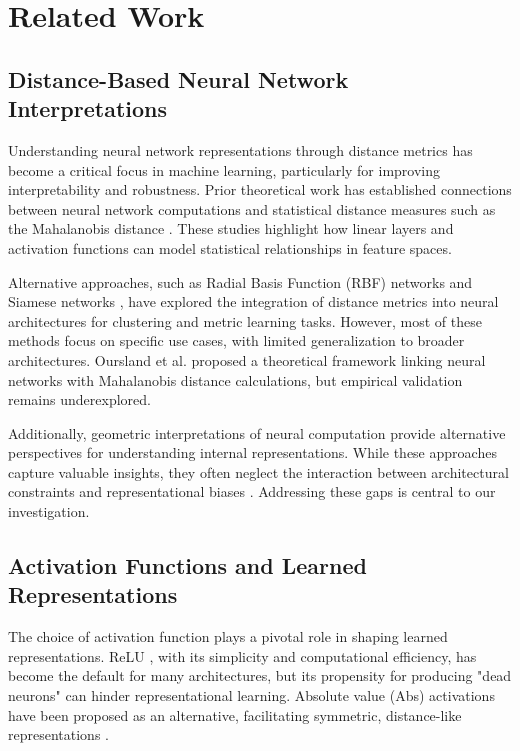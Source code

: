 \section{Related Work}

\subsection{Distance-Based Neural Network Interpretations}
Understanding neural network representations through distance metrics has become a critical focus in machine learning, particularly for improving interpretability and robustness. Prior theoretical work has established connections between neural network computations and statistical distance measures such as the Mahalanobis distance \cite{mahalanobis1936, oursland2024interpreting}. These studies highlight how linear layers and activation functions can model statistical relationships in feature spaces.

Alternative approaches, such as Radial Basis Function (RBF) networks \cite{broomhead1988rbf} and Siamese networks \cite{bromley1994signature}, have explored the integration of distance metrics into neural architectures for clustering and metric learning tasks. However, most of these methods focus on specific use cases, with limited generalization to broader architectures. Oursland et al. \cite{oursland2024interpreting} proposed a theoretical framework linking neural networks with Mahalanobis distance calculations, but empirical validation remains underexplored.

Additionally, geometric interpretations of neural computation provide alternative perspectives for understanding internal representations. While these approaches capture valuable insights, they often neglect the interaction between architectural constraints and representational biases \cite{oursland2024neural}. Addressing these gaps is central to our investigation.

\subsection{Activation Functions and Learned Representations}
The choice of activation function plays a pivotal role in shaping learned representations. ReLU \cite{nair2010relu}, with its simplicity and computational efficiency, has become the default for many architectures, but its propensity for producing "dead neurons" can hinder representational learning. Absolute value (Abs) activations have been proposed as an alternative, facilitating symmetric, distance-like representations \cite{oursland2024interpreting}.

